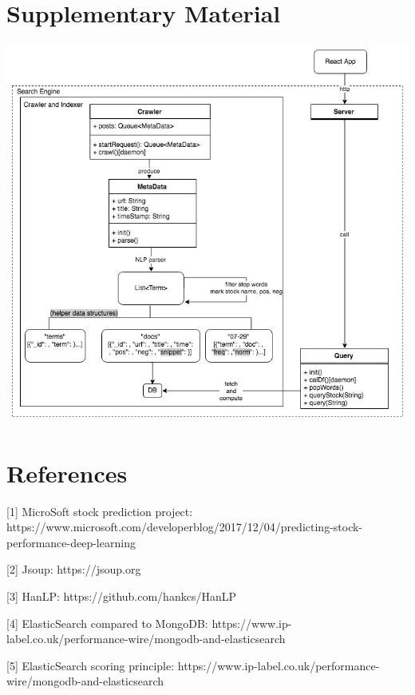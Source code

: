 \documentclass{article}
\begin{document}
\section{Supplementary Material}
\includegraphics[width=7in]{StockNLP_Pipeline}

\section{References}
\vspace{-5pt}\hspace{-15pt}[1] MicroSoft stock prediction project: https://www.microsoft.com/developerblog/2017/12/04/predicting-stock-performance-deep-learning\par
\vspace{-5pt}\hspace{-15pt}[2] Jsoup: https://jsoup.org\par
\vspace{-5pt}\hspace{-15pt}[3] HanLP: https://github.com/hankcs/HanLP\par
\vspace{-5pt}\hspace{-15pt}[4] ElasticSearch compared to MongoDB: https://www.ip-label.co.uk/performance-wire/mongodb-and-elasticsearch\par
\vspace{-5pt}\hspace{-15pt}[5] ElasticSearch scoring principle: https://www.ip-label.co.uk/performance-wire/mongodb-and-elasticsearch\par
\end{document}
